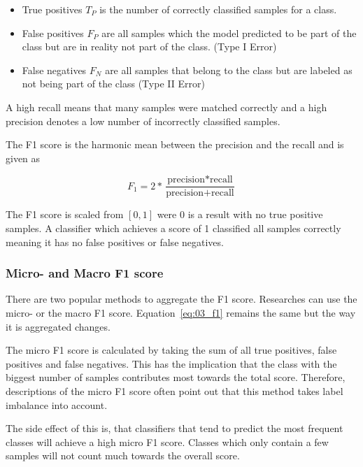 \begin{itemize}
	\item True positives $T_P$ is the number of correctly classified samples for a class.
	\item False positives $F_P$ are all samples which the model predicted to be part of the class but are in reality not part of the class. {(Type I Error)}
	\item False negatives $F_N$ are all samples that belong to the class but are labeled as not being part of the class {(Type II Error)}
\end{itemize}

A high recall means that many samples were matched correctly and a high precision denotes a low number of incorrectly classified samples.
\medskip

The F1 score is the harmonic mean between the precision and the recall and is given as

\begin{equation}
	F_1 = 2 * \frac{\text{precision}*\text{recall}}{\text{precision}+\text{recall}}
\label{eq:03_f1}
\end{equation}

The F1 score is scaled from $[0, 1]$ were 0 is a result with no true positive samples. A classifier which achieves a score of 1 classified all samples correctly meaning it has no false positives or false negatives.

\subsubsection*{Micro- and Macro F1 score}

There are two popular methods to aggregate the F1 score. Researches can use the micro- or the macro F1 score. Equation~\ref{eq:03_f1} remains the same but the way it is aggregated changes. 
\medskip

The micro F1 score is calculated by taking the sum of all true positives, false positives and false negatives. This has the implication that the class with the biggest number of samples contributes most towards the total score. Therefore, descriptions of the micro F1 score often point out that this method takes label imbalance into account. 

The side effect of this is, that classifiers that tend to predict the most frequent classes will achieve a high micro F1 score. Classes which only contain a few samples will not count much towards the overall score.
\bigskip


